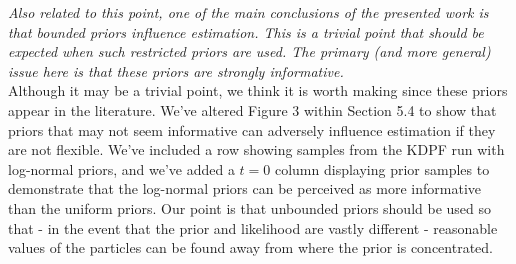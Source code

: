 \documentclass{article}
\newcommand{\danny}[1]{{\color{blue} DANNY: #1}}
\begin{document}



\noindent \emph{Also related to this point, one of the main conclusions of the presented work is that bounded priors influence estimation. This is a trivial point that should be expected when such restricted priors are used. The primary (and more general) issue here is that these priors are strongly informative.} \\

Although it may be a trivial point, we think it is worth making since these priors appear in the literature. We've altered Figure 3 within Section 5.4 to show that priors that may not seem informative can adversely influence estimation if they are not flexible. We've included a row showing samples from the KDPF run with log-normal priors, and we've added a $t = 0$ column displaying prior samples to demonstrate that the log-normal priors can be perceived as more informative than the uniform priors. Our point is that unbounded priors should be used so that - in the event that the prior and likelihood are vastly different - reasonable values of the particles can be found away from where the prior is concentrated. \\


\end{document}
